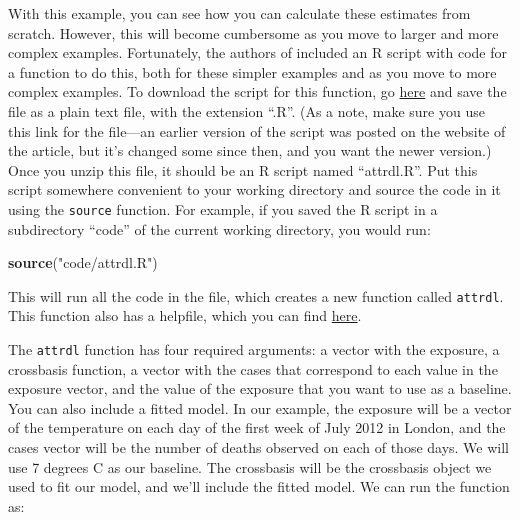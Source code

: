 \documentclass[
]{book}
\newenvironment{Shaded}{\begin{snugshade}}{\end{snugshade}}
\newcommand{\DataTypeTok}[1]{\textcolor[rgb]{0.13,0.29,0.53}{#1}}
\newcommand{\DecValTok}[1]{\textcolor[rgb]{0.00,0.00,0.81}{#1}}
\newcommand{\KeywordTok}[1]{\textcolor[rgb]{0.13,0.29,0.53}{\textbf{#1}}}
\newcommand{\NormalTok}[1]{#1}
\newcommand{\OperatorTok}[1]{\textcolor[rgb]{0.81,0.36,0.00}{\textbf{#1}}}
\newcommand{\StringTok}[1]{\textcolor[rgb]{0.31,0.60,0.02}{#1}}
\begin{document}
With this example, you can see how you can calculate these estimates from scratch. However, this will become cumbersome as you move to larger and more complex examples. Fortunately, the authors of \citet{gasparrini2014attributable} included an R script with code for a function to do this, both for these simpler examples and as you move to more complex examples. To download the script for this function, go \href{https://raw.githubusercontent.com/gasparrini/2014_gasparrini_BMCmrm_Rcodedata/master/attrdl.R}{here} and save the file as a plain text file, with the extension ``.R''. (As a note, make sure you use this link for the file---an earlier version of the script was posted on the website of the article, but it's changed some since then, and you want the newer version.) Once you unzip this file, it should be an R script named ``attrdl.R''. Put this script somewhere convenient to your working directory and source the code in it using the \texttt{source} function. For example, if you saved the R script in a subdirectory ``code'' of the current working directory, you would run:

\begin{Shaded}
\begin{Highlighting}[]
\KeywordTok{source}\NormalTok{(}\StringTok{"code/attrdl.R"}\NormalTok{)}
\end{Highlighting}
\end{Shaded}

This will run all the code in the file, which creates a new function called \texttt{attrdl}. This function also has a helpfile, which you can find \href{https://static-content.springer.com/esm/art\%3A10.1186\%2F1471-2288-14-55/MediaObjects/12874_2014_1076_MOESM2_ESM.pdf}{here}.

The \texttt{attrdl} function has four required arguments: a vector with the exposure, a crossbasis function, a vector with the cases that correspond to each value in the exposure vector, and the value of the exposure that you want to use as a baseline. You can also include a fitted model. In our example, the exposure will be a vector of the temperature on each day of the first week of July 2012 in London, and the cases vector will be the number of deaths observed on each of those days. We will use 7 degrees C as our baseline. The crossbasis will be the crossbasis object we used to fit our model, and we'll include the fitted model. We can run the function as:

\begin{Shaded}
\end{Shaded}
\end{document}
